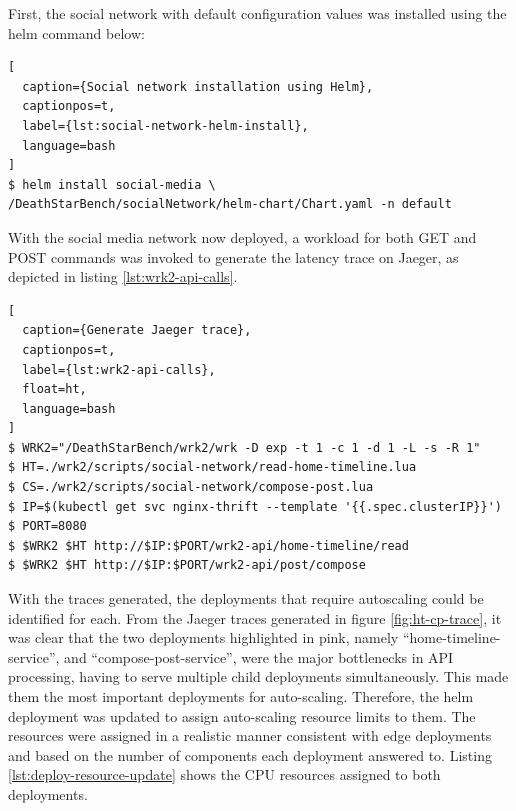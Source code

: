 First, the social network with default configuration values was installed using the helm command below:

\begin{lstlisting}[
  caption={Social network installation using Helm},
  captionpos=t,
  label={lst:social-network-helm-install},
  language=bash
]
$ helm install social-media \
/DeathStarBench/socialNetwork/helm-chart/Chart.yaml -n default
\end{lstlisting}

With the social media network now deployed, a workload for both GET and POST commands was invoked to generate the latency trace on Jaeger, as depicted in listing \ref{lst:wrk2-api-calls}.

\begin{lstlisting}[
  caption={Generate Jaeger trace},
  captionpos=t,
  label={lst:wrk2-api-calls},
  float=ht,
  language=bash
]
$ WRK2="/DeathStarBench/wrk2/wrk -D exp -t 1 -c 1 -d 1 -L -s -R 1"
$ HT=./wrk2/scripts/social-network/read-home-timeline.lua
$ CS=./wrk2/scripts/social-network/compose-post.lua
$ IP=$(kubectl get svc nginx-thrift --template '{{.spec.clusterIP}}')
$ PORT=8080
$ $WRK2 $HT http://$IP:$PORT/wrk2-api/home-timeline/read
$ $WRK2 $HT http://$IP:$PORT/wrk2-api/post/compose
\end{lstlisting}

With the traces generated, the deployments that require autoscaling could be identified for each. From the Jaeger traces generated in figure \ref{fig:ht-cp-trace}, it was clear that the two deployments highlighted in pink, namely ``home-timeline-service'', and ``compose-post-service'', were the major bottlenecks in API processing, having to serve multiple child deployments simultaneously. This made them the most important deployments for auto-scaling. Therefore, the helm deployment was updated to assign auto-scaling resource limits to them. The resources were assigned in a realistic manner consistent with edge deployments and based on the number of components each deployment answered to. Listing \ref{lst:deploy-resource-update} shows the CPU resources assigned to both deployments.\par

